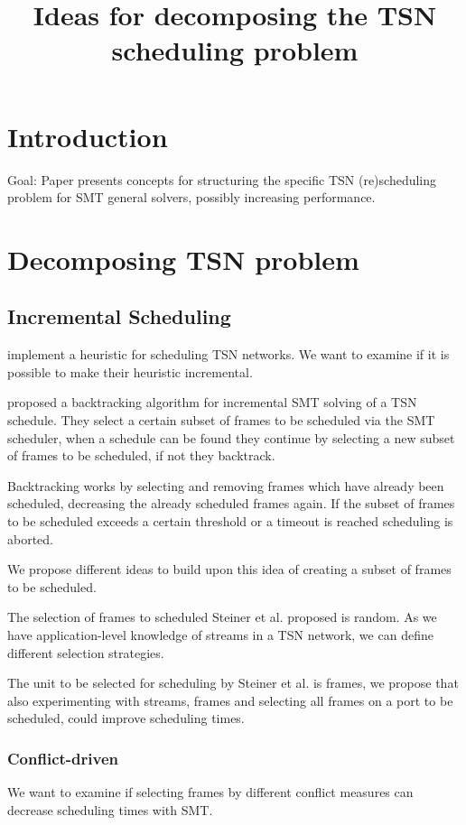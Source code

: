 \documentclass{article}
\title{Ideas for decomposing the TSN scheduling problem}
\begin{document}
	
\maketitle
	
\section{Introduction}
Goal: Paper presents concepts for structuring the specific TSN (re)scheduling problem for SMT general solvers, possibly increasing performance.

\section{Decomposing TSN problem}
\subsection{Incremental Scheduling}
\cite{vlk_large-scale_2022} implement a heuristic for scheduling TSN networks. We want to examine if it is possible to make their heuristic incremental.

\cite{steiner_evaluation_2010} proposed a backtracking algorithm for incremental SMT solving of a TSN schedule. They select a certain subset of frames to be scheduled via the SMT scheduler, when a schedule can be found they continue by selecting a new subset of frames to be scheduled, if not they backtrack.

Backtracking works by selecting and removing frames which have already been scheduled, decreasing the already scheduled frames again. If the subset of frames to be scheduled exceeds a certain threshold or a timeout is reached scheduling is aborted.

We propose different ideas to build upon this idea of creating a subset of frames to be scheduled.

The selection of frames to scheduled Steiner et al. proposed is random. As we have application-level knowledge of streams in a TSN network, we can define different selection strategies.

The unit to be selected for scheduling by Steiner et al. is frames, we propose that also experimenting with streams, frames and selecting all frames on a port to be scheduled, could improve scheduling times.

\subsubsection{Conflict-driven}
We want to examine if selecting frames by different conflict measures can decrease scheduling times with SMT.
\end{document}
